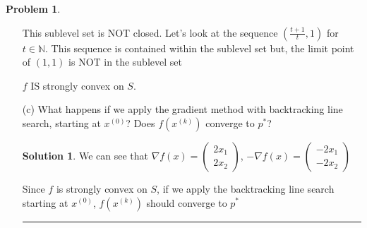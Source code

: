 \documentclass{article}
\theoremstyle{definition}
\newtheorem{problem}{Problem}
\def\fline{\rule{0.75\linewidth}{0.5pt}}
\newcommand{\finishline}{\begin{center}\fline\end{center}}
\newtheorem*{solution*}{Solution}
\newenvironment{solution}{\begin{solution*}}{{\finishline} \end{solution*}}
\begin{document}
\begin{problem}
\begin{enumerate}
    This sublevel set is NOT closed. Let's look at the sequence $(\frac{t + 1}{t}, 1)$ for $t \in \mathbb{N}$. This sequence is contained within the sublevel set but, the limit point of $(1, 1)$ is NOT in the sublevel set
    
    $f$ IS strongly convex on $S$. 

    \item[(c)] What happens if we apply the gradient method with backtracking line search, starting at $x^{(0)}$? Does $f(x^{(k)})$ converge to $p^*$? 

    \begin{solution}
    We can see that $\nabla f(x) = \begin{pmatrix}
2x_1 \\
2x_2
\end{pmatrix}$, $-\nabla f(x) = \begin{pmatrix}
-2x_1 \\
-2x_2
\end{pmatrix}$

Since $f$ is strongly convex on $S$, if we apply the backtracking line search starting at $x^{(0)}$, $f(x^{(k)})$ should converge to $p^*$
 
    \end{solution}
\end{enumerate}

    
\end{problem}
\end{document}
